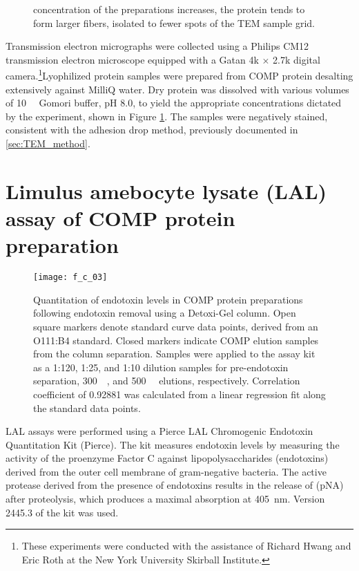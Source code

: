 \begin{refsection}
\begin{figure}
{concentration of the preparations increases, the protein tends to form larger
fibers, isolated to fewer spots of the TEM sample grid.}\label{fig:COMP_EM_3}
\end{figure}
Transmission electron micrographs were collected using a Philips CM12
transmission electron microscope equipped with a Gatan 4k ${\times}$ 2.7k
digital camera.\footnote{These experiments were conducted with the assistance of
Richard Hwang and Eric Roth at the New York University Skirball Institute.}Lyophilized protein samples were prepared from COMP protein
desalting extensively against MilliQ water. Dry protein was dissolved with
various volumes of \SI{10}{\milli\moLar} Gomori buffer, pH 8.0, to yield the
appropriate concentrations dictated by the experiment, shown in Figure
\ref{fig:COMP_EM_3}. The samples were negatively stained, consistent with
the adhesion drop method, previously documented in \ref{sec:TEM_method}. 

\section{Limulus amebocyte lysate (LAL) assay of COMP protein preparation}
\label{sec:lal_assay}
\begin{figure}[h!] \centering \texttt{[image: f\_c\_03]}
    \caption{Quantitation of endotoxin levels in COMP protein preparations
        following endotoxin removal using a Detoxi-Gel column. Open square
        markers denote standard curve data points, derived from an
         O111:B4 standard. Closed markers indicate COMP elution
        samples from the column separation. Samples were applied to the assay
        kit as a 1:120, 1:25, and 1:10 dilution samples for pre-endotoxin
        separation, \SI{300}{\milli\moLar}, and \SI{500}{\milli\moLar} elutions,
    respectively. Correlation coefficient of 0.92881 was calculated from a
linear regression fit along the standard data points.}\label{fig:LAL_assay}
\end{figure}
LAL assays were performed using a Pierce LAL Chromogenic Endotoxin Quantitation
Kit (Pierce). The kit measures endotoxin levels by measuring the activity of the
proenzyme Factor C against lipopolysaccharides (endotoxins) derived from the
outer cell membrane of gram-negative bacteria. The active protease derived from
the presence of endotoxins results in the release of 
(pNA) after proteolysis, which produces a maximal absorption at \SI{405}{\nm}.
Version 2445.3 of the kit was used.

\end{refsection}
